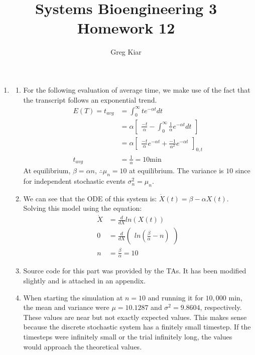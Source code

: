 \documentclass[10pt]{article}
\begin{document}
\title{ \vspace{-30mm}Systems Bioengineering 3\\Homework 12}
\author{Greg Kiar}

\maketitle
\begin{enumerate}
\item
\begin{enumerate}
\item For the following evaluation of average time, we make use of the fact that the transcript follows an exponential trend.
\begin{align*}
E(T) = t_{avg} &= \int_0^{\infty} t e^{-\alpha t} dt \\
&= \alpha \begin{bmatrix} \frac{-t}{\alpha} - \int_0^{\infty} \frac{1}{\alpha} e^{-\alpha t} dt \end{bmatrix} \\
&= \alpha \begin{bmatrix} \frac{-t}{\alpha}e^{-\alpha t} + \frac{-1}{\alpha^2} e^{-\alpha t}\end{bmatrix}_{0,t} \\
t_{avg} &= \frac{1}{\alpha} = 10 \text{min}
\end{align*}
At equilibrium, $\beta = \alpha n$, $\therefore \mu_n = 10$ at equilibrium. The variance is $10$ since for independent stochastic events $\sigma_n^2 = \mu_n$.
\item We can see that the ODE of this system is: $\dot{X}(t) = \beta - \alpha X(t)$. Solving this model using the equation: \begin{align*} \dot{X} &= \frac{d}{dX} ln(X(t)) \\ 0 &= \frac{d}{dX}\begin{pmatrix} ln(\frac{\beta}{\alpha} - n) \end{pmatrix} \\
n &= \frac{\beta}{\alpha} = 10 \end{align*}
\item Source code for this part was provided by the TAs. It has been modified slightly and is attached in an appendix.
\item When starting the simulation at $n=10$ and running it for $10,000$ min, the mean and variance were $\mu = 10.1287$ and $\sigma^2 = 9.8604$, respectively. These values are near but not exactly expected values. This makes sense because the discrete stochastic system has a finitely small timestep. If the timesteps were infinitely small or the trial infinitely long, the values would approach the theoretical values.
\end{enumerate}


\end{enumerate}
\end{document}
